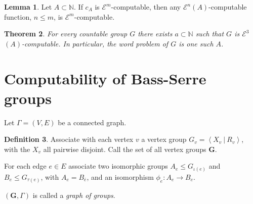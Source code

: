 \documentclass[a4paper]{article}
\newcommand{\grz}[1]{$\mathcal{E}^{#1}$}	%
\newcommand{\NN}{\mathbb{N}}	%
\newcommand{\present}[2]{\left \langle #1 \: | \: #2 \right \rangle}	%
\theoremstyle{plain}
\newtheorem{theorem}{Theorem}[section]
\theoremstyle{definition}
\newtheorem{lemma}[theorem]{Lemma}
\newtheorem{definition}[theorem]{Definition}
\begin{document}
\begin{lemma} \label{relativetonormalcomputable}
	Let $A \subset \NN$. If $c_A$ is \grz{m}-computable, then any \grz{n}$(A)$-computable function, $n \leq m$, is \grz{m}-computable.
\end{lemma}

\begin{theorem} \cite[3.2]{Cannonito_1973} \label{wp-computable-implies-group}
	For every countable group $G$ there exists $a \subset \NN$ such that $G$ is \grz{3}$(A)$-computable. In particular, the word problem of $G$ is one such $A$.
\end{theorem}


\begin{comment}
		\begin{definition} \cite[3.3]{Cannonito_1973}
			A group $G$ is ``standard'' relative to an index $(i,m,j)$ if $i$ is defined by minimalization from a presentation $1 \rightarrow K \rightarrow F \rightarrow G \rightarrow 1$ for $F$ free on at most countably many generators, $n \geq 3$, and $A \subset \NN$.
		\end{definition}

		\begin{theorem} \cite[3.4]{Cannonito_1973}
			If $G$ is finitely generated and \grz{n}$(A)$ for $n \geq 3$ then any standard index of $G$ is \grz{n}$(A)$.
		\end{theorem}
\end{comment}

\section{Computability of Bass-Serre groups \label{bass-serre}}

Let $\Gamma = (V,E)$ be a connected graph. 

\begin{definition}
Associate with each vertex $v$ a vertex group $G_v = \present{X_v}{R_v}$, with the $X_v$ all pairwise disjoint. Call the set of all vertex groups $\mathbf{G}$. 

For each edge $e \in E$ associate two isomorphic groups $A_e \leq G_{\iota(e)}$ and $B_e \leq G_{\tau(e)}$, with $A_e = B_{\bar{e}}$, and an isomorphism $\phi_e : A_e \rightarrow B_e$.

$(\mathbf{G},\Gamma)$ is called a {\it graph of groups}.
\end{definition}
\end{document}

